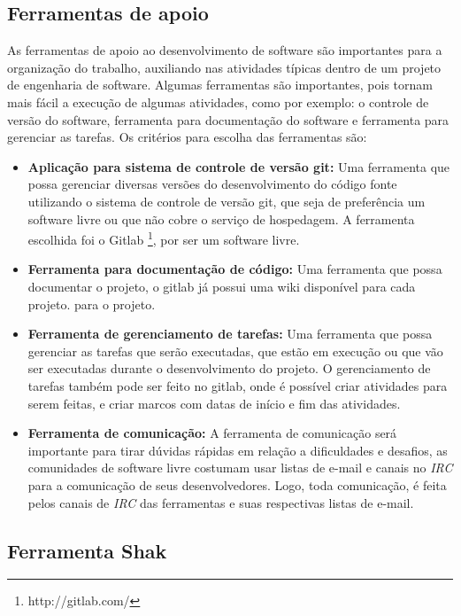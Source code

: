 \subsection{Ferramentas de apoio}

As ferramentas de apoio ao desenvolvimento de software são importantes para a
organização do trabalho, auxiliando nas atividades típicas dentro de um projeto
de engenharia de software. Algumas ferramentas são importantes, pois tornam mais fácil
a execução de algumas atividades, como por exemplo: o controle de versão do software,
ferramenta para documentação do software e ferramenta para gerenciar as tarefas.
Os critérios para escolha das ferramentas são:

\begin{itemize}
  \item \textbf{Aplicação para sistema de controle de versão git:} Uma ferramenta que
  possa gerenciar diversas versões do desenvolvimento do código fonte utilizando
  o sistema de controle de versão git, que seja de preferência um software livre
  ou que não cobre o serviço de hospedagem. A ferramenta escolhida foi o Gitlab \footnote{http://gitlab.com/}, por ser um software livre.
  \item \textbf{Ferramenta para documentação de código:} Uma ferramenta que possa
  documentar o projeto, o gitlab já possui uma wiki disponível para cada projeto.
  para o projeto.
  \item \textbf{Ferramenta de gerenciamento de tarefas:} Uma ferramenta que possa
  gerenciar as tarefas que serão executadas, que estão em execução ou que vão ser executadas
  durante o desenvolvimento do projeto. O gerenciamento de tarefas também pode ser
  feito no gitlab, onde é possível criar atividades para serem feitas, e criar marcos
  com datas de início e fim das atividades.
  \item \textbf{Ferramenta de comunicação:} A ferramenta de comunicação será
  importante para tirar dúvidas rápidas em relação a dificuldades e desafios, as
  comunidades de software livre costumam usar listas de e-mail e canais no \textit{IRC}
  para a comunicação de seus desenvolvedores. Logo, toda comunicação, é feita
  pelos canais de \textit{IRC} das ferramentas e suas respectivas listas de e-mail.
\end{itemize}

\subsection{Ferramenta Shak}

